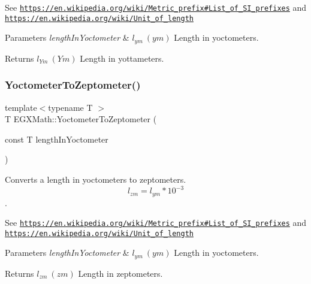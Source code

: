 See \href{https://en.wikipedia.org/wiki/Metric_prefix#List_of_SI_prefixes}{\tt https\+://en.\+wikipedia.\+org/wiki/\+Metric\+\_\+prefix\#\+List\+\_\+of\+\_\+\+S\+I\+\_\+prefixes} and \href{https://en.wikipedia.org/wiki/Unit_of_length}{\tt https\+://en.\+wikipedia.\+org/wiki/\+Unit\+\_\+of\+\_\+length} 
\begin{DoxyParams}{Parameters}
{\em length\+In\+Yoctometer} & $ l_{ym}\ (ym)$ Length in yoctometers. \\
\hline
\end{DoxyParams}
\begin{DoxyReturn}{Returns}
$ l_{Ym}\ (Ym)$ Length in yottameters. 
\end{DoxyReturn}
\mbox{\label{group___e_g_x_math-_conversions-_length_conversions-_s_i-_yoctometer-_s_i_gab7c5e5b6659fb99614f1e47b8033ea85}} 
\subsubsection{\texorpdfstring{Yoctometer\+To\+Zeptometer()}{YoctometerToZeptometer()}}
{\footnotesize\ttfamily template$<$typename T $>$ \\
T E\+G\+X\+Math\+::\+Yoctometer\+To\+Zeptometer (\begin{DoxyParamCaption}\item[{const T}]{length\+In\+Yoctometer }\end{DoxyParamCaption})}



Converts a length in yoctometers to zeptometers. \[ l_{zm}=l_{ym} * 10^{-3} \]. 

See \href{https://en.wikipedia.org/wiki/Metric_prefix#List_of_SI_prefixes}{\tt https\+://en.\+wikipedia.\+org/wiki/\+Metric\+\_\+prefix\#\+List\+\_\+of\+\_\+\+S\+I\+\_\+prefixes} and \href{https://en.wikipedia.org/wiki/Unit_of_length}{\tt https\+://en.\+wikipedia.\+org/wiki/\+Unit\+\_\+of\+\_\+length} 
\begin{DoxyParams}{Parameters}
{\em length\+In\+Yoctometer} & $ l_{ym}\ (ym)$ Length in yoctometers. \\
\hline
\end{DoxyParams}
\begin{DoxyReturn}{Returns}
$ l_{zm}\ (zm)$ Length in zeptometers. 
\end{DoxyReturn}
\mbox{\label{group___e_g_x_math-_conversions-_length_conversions-_s_i-_yoctometer-_s_i_gab7fc23a884fab0c6248edee754bd6e25}} 

